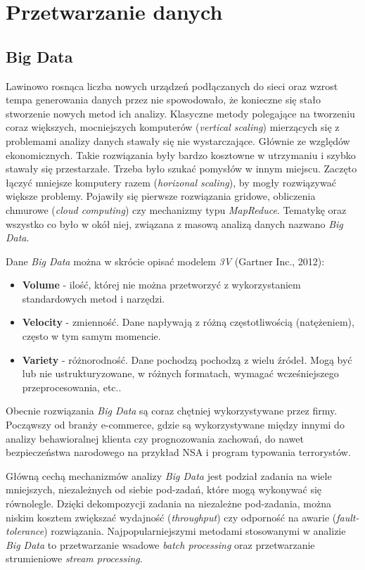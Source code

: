 \section{Przetwarzanie danych}
\subsection{Big Data}
Lawinowo rosnąca liczba nowych urządzeń podłączanych do sieci
oraz wzrost tempa generowania danych przez nie spowodowało,
że konieczne się stało stworzenie nowych metod ich analizy.
Klasyczne metody polegające na tworzeniu coraz większych,
mocniejszych komputerów (\textit{vertical scaling})
mierzących się z problemami analizy danych stawały się nie wystarczające.
Głównie ze względów ekonomicznych.
Takie rozwiązania były bardzo kosztowne w utrzymaniu i szybko stawały się przestarzałe.
Trzeba było szukać pomysłów w innym miejscu.
Zaczęto łączyć mniejsze komputery razem (\textit{horizonal scaling}),
by mogły rozwiązywać większe problemy.
Pojawiły się pierwsze rozwiązania gridowe,
obliczenia chmurowe (\textit{cloud computing})
czy mechanizmy typu \textit{MapReduce}.
Tematykę oraz wszystko co było w okół niej,
związana z masową analizą danych nazwano \textit{Big Data}.

Dane \textit{Big Data} można w skrócie opisać modelem \textit{3V} (Gartner Inc., 2012):
\begin{itemize}
		\item \textbf{Volume} - ilość,
		której nie można przetworzyć z wykorzystaniem standardowych metod i narzędzi.
		\item \textbf{Velocity} - zmienność.
		Dane napływają z różną częstotliwością (natężeniem),
		często w tym samym momencie.
		\item \textbf{Variety} - różnorodność.
		Dane pochodzą pochodzą z wielu źródeł.
		Mogą być lub nie ustrukturyzowane,
		w różnych formatach,
		wymagać wcześniejszego przeprocesowania,
		etc..
\end{itemize}

Obecnie rozwiązania \textit{Big Data} są coraz chętniej wykorzystywane przez firmy.
Począwszy od branży e-commerce,
gdzie są wykorzystywane między innymi do analizy behawioralnej klienta czy prognozowania zachowań,
do nawet bezpieczeństwa narodowego
na przykład NSA i program typowania terrorystów.

Główną cechą mechanizmów analizy \textit{Big Data} jest podział zadania
na wiele mniejszych,
niezależnych od siebie pod-zadań,
które mogą wykonywać się równolegle.
Dzięki dekompozycji zadania na niezależne pod-zadania,
można niskim kosztem zwiększać wydajność (\textit{throughput})
czy odporność na awarie (\textit{fault-tolerance}) rozwiązania.
Najpopularniejszymi metodami stosowanymi w analizie \textit{Big Data} to
przetwarzanie wsadowe \textit{batch processing}
oraz przetwarzanie strumieniowe \textit{stream processing}.

